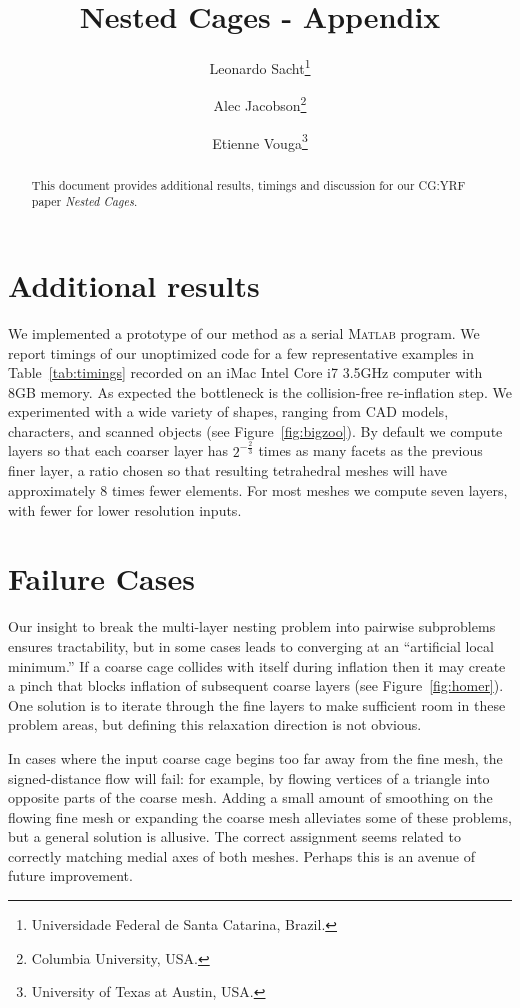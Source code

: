 \documentclass{cgyrf15}
\title{Nested Cages - Appendix}
\author{
Leonardo Sacht\thanks{Universidade Federal de Santa Catarina, Brazil.} \and
Alec Jacobson\thanks{Columbia University, USA.} \and
Etienne Vouga\thanks{University of Texas at Austin, USA.} 
}
\begin{document}
\maketitle

\begin{abstract}
This document provides additional results, timings and discussion
for our CG:YRF paper \emph{Nested Cages}.
\end{abstract}

\section{Additional results}

We implemented a prototype of our method as a serial \textsc{Matlab} program.
%
We report timings of our unoptimized code for a few representative examples in
Table~\ref{tab:timings} recorded on an iMac Intel Core i7 3.5GHz computer with 8GB
memory.
%
As expected the bottleneck is the collision-free re-inflation step.
%
We experimented with a wide variety of shapes, ranging from CAD models,
characters, and scanned objects (see Figure~\ref{fig:bigzoo}). By default we compute
layers so that each coarser layer has $2^{-\frac{2}{3}}$ times as many facets as
the previous finer layer, a ratio chosen so that resulting tetrahedral
meshes will have approximately $8$ times fewer elements. For most
meshes we compute seven layers, with fewer for lower resolution inputs.

\section{Failure Cases}

Our insight to break the multi-layer nesting problem into pairwise subproblems
ensures tractability, but in some cases leads to converging at an
``artificial local minimum.'' If a coarse cage collides with itself during
inflation then it may create a pinch that blocks inflation of subsequent coarse
layers (see Figure~\ref{fig:homer}).
%
One solution is to iterate through the fine layers to make sufficient room in
these problem areas, but defining this relaxation direction is not obvious.

In cases where the input coarse cage begins too far away from the fine mesh,
the signed-distance flow will fail: for example, by flowing vertices of a
triangle into opposite parts of the coarse mesh. 
%
Adding a small amount of smoothing on the flowing fine mesh or expanding the
coarse mesh alleviates some of these problems, but a general solution is
allusive.
%
The correct assignment seems related to correctly matching medial axes of both
meshes. Perhaps this is an avenue of future improvement.
\end{document}

